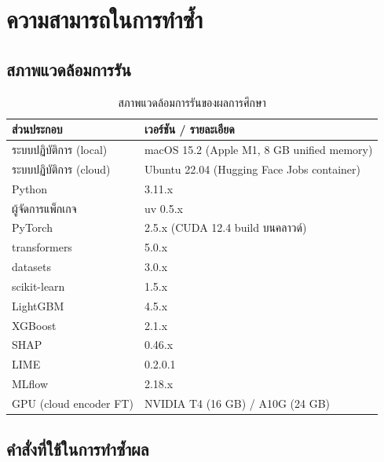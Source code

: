 \chapter{ความสามารถในการทำซ้ำ}
\label{app:repro}

\section{สภาพแวดล้อมการรัน}

\begin{table}[H]
\centering
\caption{สภาพแวดล้อมการรันของผลการศึกษา}
\begin{tabularx}{\textwidth}{lX}
\toprule
\textbf{ส่วนประกอบ} & \textbf{เวอร์ชัน / รายละเอียด} \\
\midrule
ระบบปฏิบัติการ (local)        & macOS 15.2 (Apple M1, 8 GB unified memory) \\
ระบบปฏิบัติการ (cloud)        & Ubuntu 22.04 (Hugging Face Jobs container) \\
Python                        & 3.11.x \\
ผู้จัดการแพ็กเกจ              & uv 0.5.x \\
PyTorch                       & 2.5.x (CUDA 12.4 build บนคลาวด์) \\
transformers                  & 5.0.x \\
datasets                      & 3.0.x \\
scikit-learn                  & 1.5.x \\
LightGBM                      & 4.5.x \\
XGBoost                       & 2.1.x \\
SHAP                          & 0.46.x \\
LIME                          & 0.2.0.1 \\
MLflow                        & 2.18.x \\
GPU (cloud encoder FT)        & NVIDIA T4 (16 GB) / A10G (24 GB) \\
\bottomrule
\end{tabularx}
\end{table}

\section{คำสั่งที่ใช้ในการทำซ้ำผล}


